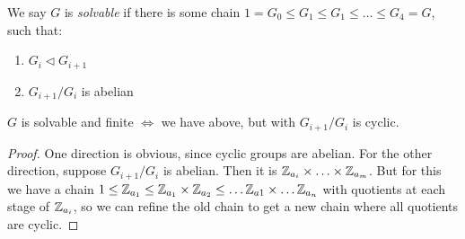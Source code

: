 \documentclass[a4paper, 10pt, twocolumn]{amsart}
\begin{document}
We say $G$ is \emph{solvable} if there is some chain $1 = G_0 \leq G_1 \leq G_1 \leq \ldots \leq G_4 = G$, such that:
\begin{enumerate}
\item $G_i \triangleleft G_{i+1}$
\item $G_{i+1}/G_{i}$ is abelian
\end{enumerate}

\begin{lemma}
$G$ is solvable and finite $\iff$ we have above, but with $G_{i+1}/G_{i}$ is cyclic.
\end{lemma}
\begin{proof}
One direction is obvious, since cyclic groups are abelian. For the other direction, suppose $G_{i+1}/G_i$ is abelian. Then it is $\mathbb{Z}_{a_i} \times \ldots \times \mathbb{Z}_{a_m}$. But for this we have a chain $1 \leq \mathbb{Z}_{a_1} \leq \mathbb{Z}_{a_1}\times \mathbb{Z}_{a_2} \leq \ldots \mathbb{Z}_{a1} \times \ldots \mathbb{Z}_{a_n}$ with quotients at each stage of $\mathbb{Z}_{a_i}$, so we can refine the old chain to get a new chain where all quotients are cyclic.
\end{proof}
\end{document}
